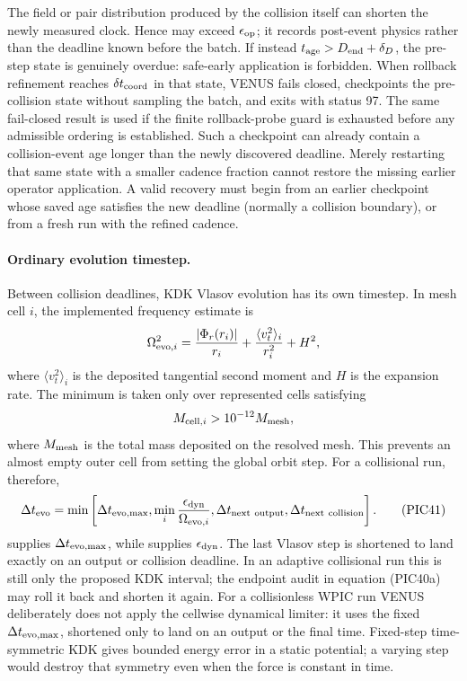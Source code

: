 The field or pair distribution produced by the collision itself can shorten
the newly measured clock.  Hence
 may exceed
\(\epsilon_{\rm op}\); it records post-event physics rather than the deadline
known before the batch.  If instead
\(t_{\rm age}>D_{\rm end}+\delta_D\), the pre-step state is genuinely overdue:
safe-early application is forbidden.  When rollback refinement reaches
\(\delta t_{\rm coord}\) in that state, VENUS fails closed, checkpoints the
pre-collision state without sampling the batch, and exits with status 97.
The same fail-closed result is used if the finite rollback-probe guard is
exhausted before any admissible ordering is established.  Such a checkpoint
can already contain a
collision-event age longer than the newly discovered deadline.  Merely
restarting that same state with a smaller cadence fraction cannot restore the
missing earlier operator application.  A valid recovery must begin from an
earlier checkpoint whose saved age satisfies the new deadline (normally a
collision boundary), or from a fresh run with the refined cadence.

\paragraph{Ordinary evolution timestep.}
Between collision deadlines, KDK Vlasov evolution has its own timestep.  In
mesh cell \(i\), the implemented frequency estimate is
\[
 \Omega_{{\rm evo},i}^2=
 \frac{|\Phi_r(r_i)|}{r_i}
 +\frac{\langle v_t^2\rangle_i}{r_i^2}+H^2 ,
\]
where \(\langle v_t^2\rangle_i\) is the deposited tangential second moment
and \(H\) is the expansion rate.  The minimum is taken only over represented
cells satisfying
\[
 M_{{\rm cell},i}>10^{-12}M_{\rm mesh},
\]
where \(M_{\rm mesh}\) is the total mass deposited on the resolved mesh.
This prevents an almost empty outer cell from setting the global orbit step.
For a collisional run, therefore,
\[
 \Delta t_{\rm evo}=
 \min\left[\Delta t_{\rm evo,max},
 \min_i\frac{\epsilon_{\rm dyn}}{\Omega_{{\rm evo},i}},
 \Delta t_{\rm next\ output},
 \Delta t_{\rm next\ collision}\right].                \tag{PIC41}
\]
 supplies \(\Delta t_{\rm evo,max}\), while
 supplies \(\epsilon_{\rm dyn}\).  The last Vlasov
step is shortened to land exactly on an output or collision deadline.  In an
adaptive collisional run this is still only the proposed KDK interval; the
endpoint audit in equation (PIC40a) may roll it back and shorten it again.
For a collisionless WPIC run VENUS deliberately does not apply the cellwise
dynamical limiter: it uses the fixed
\(\Delta t_{\rm evo,max}\), shortened only to land on an output or the final
time.  Fixed-step time-symmetric KDK gives bounded energy error in a static
potential; a varying step would destroy that symmetry even when the force is
constant in time.

